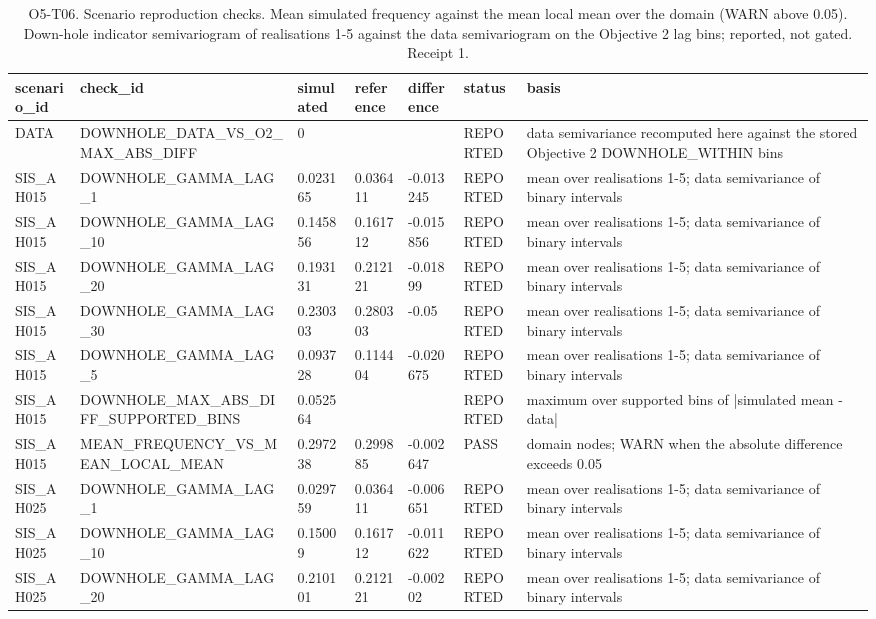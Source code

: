 \begin{table}[ht]
\centering
\scriptsize
\caption{O5-T06. Scenario reproduction checks. Mean simulated frequency against the mean local mean over the domain (WARN above 0.05). Down-hole indicator semivariogram of realisations 1-5 against the data semivariogram on the Objective 2 lag bins; reported, not gated. Receipt 1.}
\label{tab:O5T06}
\begin{tabular}{lllllll}
\toprule
scenario\_id & check\_id & simulated & reference & difference & status & basis \\
\midrule
DATA & DOWNHOLE\_DATA\_VS\_O2\_MAX\_ABS\_DIFF & 0 &  &  & REPORTED & data semivariance recomputed here against the stored Objective 2 DOWNHOLE\_WITHIN bins \\
SIS\_AH015 & DOWNHOLE\_GAMMA\_LAG\_1 & 0.023165 & 0.036411 & -0.013245 & REPORTED & mean over realisations 1-5; data semivariance of binary intervals \\
SIS\_AH015 & DOWNHOLE\_GAMMA\_LAG\_10 & 0.145856 & 0.161712 & -0.015856 & REPORTED & mean over realisations 1-5; data semivariance of binary intervals \\
SIS\_AH015 & DOWNHOLE\_GAMMA\_LAG\_20 & 0.193131 & 0.212121 & -0.01899 & REPORTED & mean over realisations 1-5; data semivariance of binary intervals \\
SIS\_AH015 & DOWNHOLE\_GAMMA\_LAG\_30 & 0.230303 & 0.280303 & -0.05 & REPORTED & mean over realisations 1-5; data semivariance of binary intervals \\
SIS\_AH015 & DOWNHOLE\_GAMMA\_LAG\_5 & 0.093728 & 0.114404 & -0.020675 & REPORTED & mean over realisations 1-5; data semivariance of binary intervals \\
SIS\_AH015 & DOWNHOLE\_MAX\_ABS\_DIFF\_SUPPORTED\_BINS & 0.052564 &  &  & REPORTED & maximum over supported bins of |simulated mean - data| \\
SIS\_AH015 & MEAN\_FREQUENCY\_VS\_MEAN\_LOCAL\_MEAN & 0.297238 & 0.299885 & -0.002647 & PASS & domain nodes; WARN when the absolute difference exceeds 0.05 \\
SIS\_AH025 & DOWNHOLE\_GAMMA\_LAG\_1 & 0.029759 & 0.036411 & -0.006651 & REPORTED & mean over realisations 1-5; data semivariance of binary intervals \\
SIS\_AH025 & DOWNHOLE\_GAMMA\_LAG\_10 & 0.15009 & 0.161712 & -0.011622 & REPORTED & mean over realisations 1-5; data semivariance of binary intervals \\
SIS\_AH025 & DOWNHOLE\_GAMMA\_LAG\_20 & 0.210101 & 0.212121 & -0.00202 & REPORTED & mean over realisations 1-5; data semivariance of binary intervals \\

\end{tabular}
\end{table}
